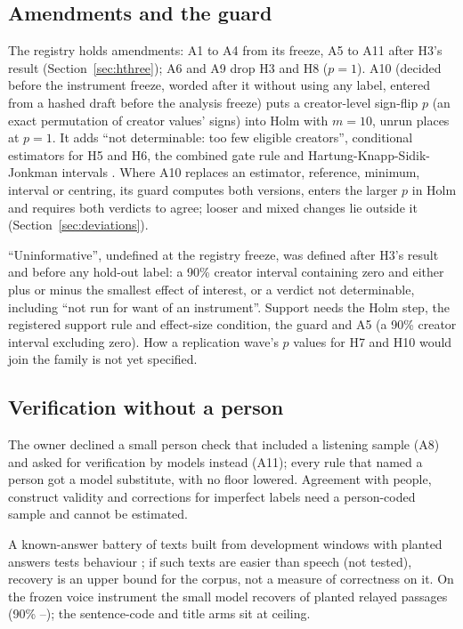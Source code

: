 \subsection{Amendments and the guard}
\label{sec:amendments}

The registry holds \NAmendments{} amendments: A1 to A4 from its freeze, A5 to A11 after H3's result
(Section~\ref{sec:hthree}); A6 and A9 drop H3 and H8 ($p = 1$). A10 (decided before the instrument freeze, worded
after it without using any label, entered from a hashed draft before the analysis freeze) puts a creator-level
sign-flip $p$ (an exact permutation of creator values' signs) into Holm with $m = 10$, unrun places at $p = 1$.
It adds ``not determinable: too few eligible creators'', conditional estimators for H5 and H6, the combined gate rule
and Hartung-Knapp-Sidik-Jonkman intervals \cite{inthout2014hartung}. Where A10 replaces an estimator, reference,
minimum, interval or centring, its guard computes both versions, enters the larger $p$ in Holm and requires both
verdicts to agree; looser and mixed changes lie outside it (Section~\ref{sec:deviations}).

``Uninformative'', undefined at the registry freeze, was defined after H3's result and before any hold-out label: a
90\% creator interval containing zero and either plus or minus the smallest effect of interest, or a verdict not
determinable, including ``not run for want of an instrument''. Support needs the Holm step, the registered support rule
and effect-size condition, the guard and A5 (a 90\% creator interval excluding zero). How a replication wave's $p$ values for H7 and H10 would join the family is not yet
specified.

\subsection{Verification without a person}
\label{sec:verification}

The owner declined a small person check that included a listening sample (A8) and asked for verification by models
instead (A11); every rule that named a person got a model substitute, with no floor lowered. Agreement with people,
construct validity and corrections for imperfect labels \cite{teblunthuis2023misclassification,egami2023imperfect}
need a person-coded sample and cannot be estimated.

A known-answer battery of texts built from development windows with planted answers tests behaviour
\cite{ribeiro2020beyond}; if such texts are easier than speech (not tested), recovery is an upper bound for the
corpus, not a measure of correctness on it. On the frozen voice instrument the small model recovers \KaKoneRSmallRevThree{} of planted
relayed passages (90\% \KaKoneRSmallRevThreeLo--\KaKoneRSmallRevThreeHi); the sentence-code and title arms sit at ceiling.

